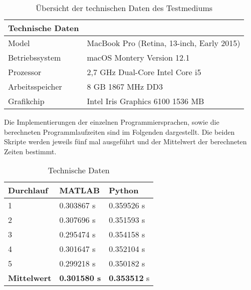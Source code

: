 \begin{table}[H]
	\centering
	\begin{tabular}{|l|l|}
		\multicolumn{1}{l}{\textbf{Technische Daten}} & \multicolumn{1}{l}{}                       \\ 
		\hline
		Model                                         & MacBook Pro (Retina, 13-inch, Early 2015)  \\ 
		\hline
		Betriebssystem                                & macOS Montery Version 12.1                 \\ 
		\hline
		Prozessor                                     & 2,7 GHz Dual-Core Intel Core i5            \\ 
		\hline
		Arbeitsspeicher                               & 8 GB 1867 MHz DD3                          \\ 
		\hline
		Grafikchip                                    & Intel Iris Graphics 6100 1536 MB           \\
		\hline
	\end{tabular}
	\caption{Übersicht der technischen Daten des Testmediums}
\end{table}

Die Implementierungen der einzelnen Programmiersprachen, sowie die berechneten Programmlaufzeiten sind im Folgenden dargestellt. Die beiden Skripte werden jeweils fünf mal ausgeführt und der Mittelwert der berechneten Zeiten bestimmt.




\begin{table}[H]
	\centering
	\caption{Technische Daten}
	\begin{tabular}{|l|l|l|}
		\multicolumn{1}{l}{\textbf{Durchlauf}} & \multicolumn{1}{l}{\textbf{MATLAB}} & \multicolumn{1}{l}{\textbf{Python}}  \\ 
		\hline
		1                                      & 0.303867 s                          & 0.359526
		s                           \\ 
		\hline
		2                                      & 0.307696
		s                          & 0.351593
		s                           \\ 
		\hline
		3                                      & 0.295474
		s                          & 0.354158
		s                           \\ 
		\hline
		4                                      & 0.301647 s                          & 0.352104 s                           \\ 
		\hline
		5                                      & 0.299218 s                          & 0.350182 s                           \\ 
		\hline
		\textbf{Mittelwert}                    & \textbf{0.301580 s}                          & \textbf{0.353512} s                           \\
		\hline
	\end{tabular}
\end{table}

